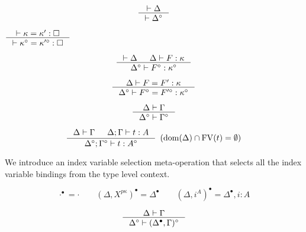 \begin{theorem}
\label{thm:Fixierasetyctx}
\[ \inference{|- \Delta}{|- \Delta^\circ} \]
\end{theorem}

\begin{theorem}\label{thm:Fixierasekindeq}
$ \inference{|- \kappa=\kappa':\square}
        {|- \kappa^\circ=\kappa'^\circ:\square}
$
\end{theorem}

\begin{theorem}
\label{thm:Fixierasekinding}
\[ \inference{|- \Delta & \Delta |- F : \kappa}
                {\Delta^\circ |- F^\circ : \kappa^\circ}
\]
\end{theorem}
\begin{theorem}
\[ \inference{\Delta |- F=F':\kappa}
                {\Delta^\circ |- F^\circ=F'^\circ:\kappa^\circ}
\]
\label{thm:Fixierasetyconeq}
\end{theorem}

\begin{theorem}
\label{thm:Fixierasetmctx}
\[ \inference{\Delta |- \Gamma}{\Delta^\circ |- \Gamma^\circ} \]
\end{theorem}

\begin{theorem}
\label{thm:Fixierasetypingifree}
\[ \inference{ \Delta |- \Gamma & \Delta;\Gamma |- t : A}
                {\Delta^\circ;\Gamma^\circ |- t : A^\circ}
                {\enspace(\dom(\Delta)\cap\FV(t) = \emptyset)}
\]
\end{theorem}


We introduce an index variable selection meta-operation that selects all
the index variable bindings from the type level context.
\begin{definition}
\[ \cdot^\bullet = \cdot \qquad
        (\Delta,X^{p\kappa})^\bullet = \Delta^\bullet \qquad
        (\Delta,i^A)^\bullet = \Delta^\bullet,i:A
\]
\end{definition}

\begin{theorem}
\label{thm:Fixierasetmctxivs}
\[ \inference{\Delta |- \Gamma}{\Delta^\circ |- (\Delta^\bullet,\Gamma)^\circ}
\]
\end{theorem}

